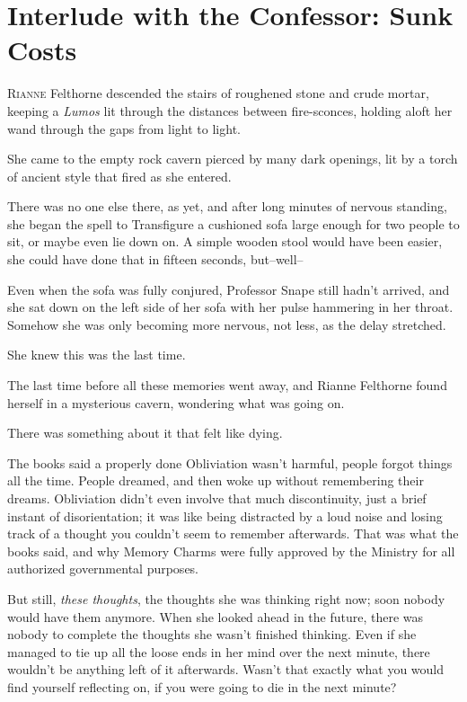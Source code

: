 \chapter{Interlude with the Confessor: Sunk Costs}

\lettrine{R}{ianne} Felthorne descended the stairs of roughened stone and crude mortar, keeping a \emph{Lumos} lit through the distances between fire-sconces, holding aloft her wand through the gaps from light to light.

She came to the empty rock cavern pierced by many dark openings, lit by a torch of ancient style that fired as she entered.

There was no one else there, as yet, and after long minutes of nervous standing, she began the spell to Transfigure a cushioned sofa large enough for two people to sit, or maybe even lie down on. A simple wooden stool would have been easier, she could have done that in fifteen seconds, but\---well\---

Even when the sofa was fully conjured, Professor Snape still hadn't arrived, and she sat down on the left side of her sofa with her pulse hammering in her throat. Somehow she was only becoming more nervous, not less, as the delay stretched.

She knew this was the last time.

The last time before all these memories went away, and Rianne Felthorne found herself in a mysterious cavern, wondering what was going on.

There was something about it that felt like dying.

The books said a properly done Obliviation wasn't harmful, people forgot things all the time. People dreamed, and then woke up without remembering their dreams. Obliviation didn't even involve that much discontinuity, just a brief instant of disorientation; it was like being distracted by a loud noise and losing track of a thought you couldn't seem to remember afterwards. That was what the books said, and why Memory Charms were fully approved by the Ministry for all authorized governmental purposes.

But still, \emph{these thoughts}, the thoughts she was thinking right now; soon nobody would have them anymore. When she looked ahead in the future, there was nobody to complete the thoughts she wasn't finished thinking. Even if she managed to tie up all the loose ends in her mind over the next minute, there wouldn't be anything left of it afterwards. Wasn't that exactly what you would find yourself reflecting on, if you were going to die in the next minute?


